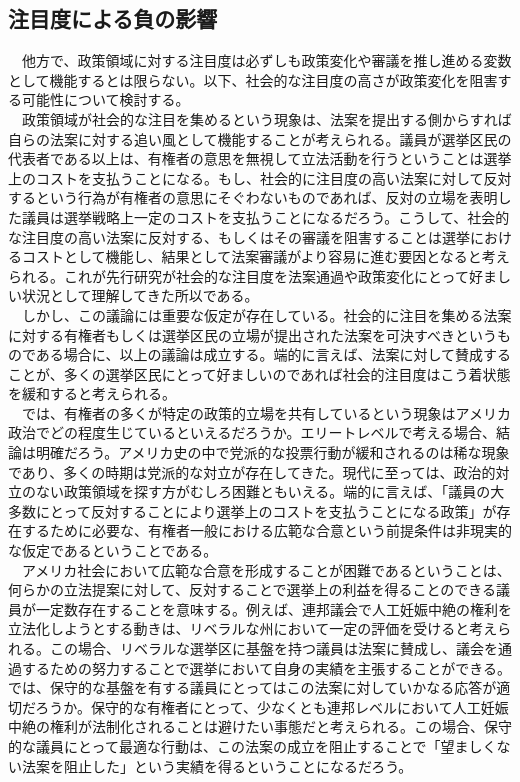 \documentclass[here]{article}
\begin{document}
\subsection{注目度による負の影響}
　他方で、政策領域に対する注目度は必ずしも政策変化や審議を推し進める変数として機能するとは限らない。以下、社会的な注目度の高さが政策変化を阻害する可能性について検討する。\\
　政策領域が社会的な注目を集めるという現象は、法案を提出する側からすれば自らの法案に対する追い風として機能することが考えられる。議員が選挙区民の代表者である以上は、有権者の意思を無視して立法活動を行うということは選挙上のコストを支払うことになる。もし、社会的に注目度の高い法案に対して反対するという行為が有権者の意思にそぐわないものであれば、反対の立場を表明した議員は選挙戦略上一定のコストを支払うことになるだろう。こうして、社会的な注目度の高い法案に反対する、もしくはその審議を阻害することは選挙におけるコストとして機能し、結果として法案審議がより容易に進む要因となると考えられる。これが先行研究が社会的な注目度を法案通過や政策変化にとって好ましい状況として理解してきた所以である。\\
　しかし、この議論には重要な仮定が存在している。社会的に注目を集める法案に対する有権者もしくは選挙区民の立場が提出された法案を可決すべきというものである場合に、以上の議論は成立する。端的に言えば、法案に対して賛成することが、多くの選挙区民にとって好ましいのであれば社会的注目度はこう着状態を緩和すると考えられる。\\
　では、有権者の多くが特定の政策的立場を共有しているという現象はアメリカ政治でどの程度生じているといえるだろうか。エリートレベルで考える場合、結論は明確だろう。アメリカ史の中で党派的な投票行動が緩和されるのは稀な現象であり、多くの時期は党派的な対立が存在してきた。\citep*{Poole2007-ir,}現代に至っては、政治的対立のない政策領域を探す方がむしろ困難ともいえる。端的に言えば、「議員の大多数にとって反対することにより選挙上のコストを支払うことになる政策」が存在するために必要な、有権者一般における広範な合意という前提条件は非現実的な仮定であるということである。\\
　アメリカ社会において広範な合意を形成することが困難であるということは、何らかの立法提案に対して、反対することで選挙上の利益を得ることのできる議員が一定数存在することを意味する。例えば、連邦議会で人工妊娠中絶の権利を立法化しようとする動きは、リベラルな州において一定の評価を受けると考えられる。この場合、リベラルな選挙区に基盤を持つ議員は法案に賛成し、議会を通過するための努力することで選挙において自身の実績を主張することができる。では、保守的な基盤を有する議員にとってはこの法案に対していかなる応答が適切だろうか。保守的な有権者にとって、少なくとも連邦レベルにおいて人工妊娠中絶の権利が法制化されることは避けたい事態だと考えられる。この場合、保守的な議員にとって最適な行動は、この法案の成立を阻止することで「望ましくない法案を阻止した」という実績を得るということになるだろう。\\
\end{document}
